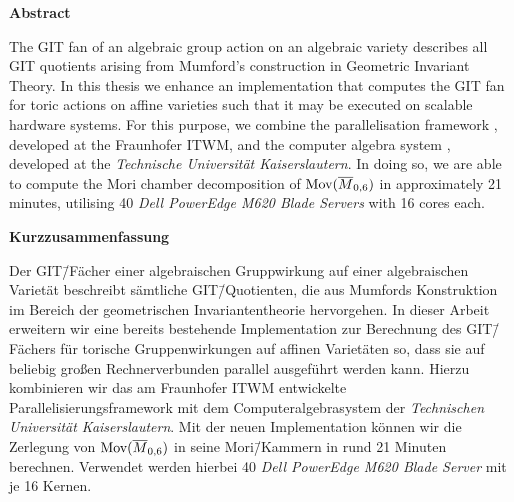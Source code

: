 \begin{center}
	\Large \textbf{Abstract}
\end{center}

The GIT fan of an algebraic group action on an algebraic variety describes all GIT quotients arising from Mumford's construction in Geometric Invariant Theory. In this thesis we enhance an implementation that computes the GIT fan for toric actions on affine varieties such that it may be executed on scalable hardware systems. For this purpose, we combine the parallelisation framework \gpispace{}, developed at the \acl{Fraunhofer ITWM}, and the computer algebra system \singular{}, developed at the \emph{Technische Universität Kaiserslautern}. In doing so, we are able to compute the Mori chamber decomposition of $\text{Mov}(\overline{M}_{0,6})$ in approximately 21 minutes, utilising 40 \emph{Dell PowerEdge M620 Blade Servers} with 16 cores each.


\begin{center}
\Large \textbf{Kurzzusammenfassung}
\end{center}

Der GIT\=/Fächer einer algebraischen Gruppwirkung auf einer algebraischen Varietät beschreibt sämtliche GIT\=/Quotienten, die aus Mumfords Konstruktion im Bereich der geometrischen Invariantentheorie hervorgehen. In dieser Arbeit erweitern wir eine bereits bestehende Implementation zur Berechnung des GIT\=/Fächers für torische Gruppenwirkungen auf affinen Varietäten so, dass sie auf beliebig großen Rechnerverbunden parallel ausgeführt werden kann. Hierzu kombinieren wir das am \acl{Fraunhofer ITWM} entwickelte Parallelisierungsframework \gpispace{} mit dem Computeralgebrasystem \singular{} der \emph{Technischen Universität Kaiserslautern}. Mit der neuen Implementation können wir die Zerlegung von $\text{Mov}(\overline{M}_{0,6})$ in seine Mori\=/Kammern in rund 21 Minuten berechnen. Verwendet werden hierbei 40 \emph{Dell PowerEdge M620 Blade Server} mit je 16 Kernen.